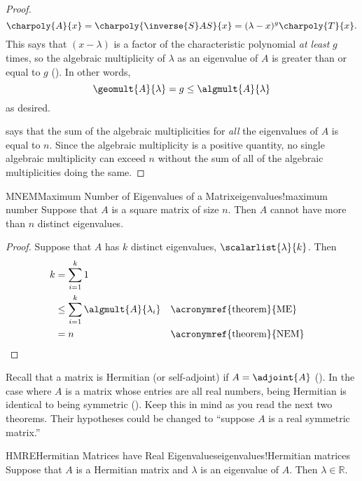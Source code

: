 \begin{proof}
%
\begin{equation*}
\charpoly{A}{x}=\charpoly{\inverse{S}AS}{x}=(\lambda-x)^g\charpoly{T}{x}.
\end{equation*}
%
This says that $(x-\lambda)$ is a factor of the characteristic polynomial {\em at least} $g$ times, so the algebraic multiplicity of $\lambda$ as an eigenvalue of $A$ is greater than or equal to $g$ ().  In other words,
%
\begin{equation*}
\geomult{A}{\lambda}=g\leq\algmult{A}{\lambda}
\end{equation*}
%
as desired.\par
%
 says that the sum of the algebraic multiplicities for {\em all} the eigenvalues of $A$ is equal to $n$.  Since the algebraic multiplicity is a positive quantity, no single algebraic multiplicity can exceed $n$ without the sum of all of the algebraic multiplicities doing the same.
%
\end{proof}
%
%
\begin{theorem}{MNEM}{Maximum Number of Eigenvalues of a Matrix}{eigenvalues!maximum number}
Suppose that $A$ is a square matrix of size $n$.  Then $A$ cannot have more than $n$ distinct eigenvalues.
\end{theorem}
%
\begin{proof}
Suppose that $A$ has $k$ distinct eigenvalues, $\scalarlist{\lambda}{k}$.  Then
%
\begin{align*}
k&=\sum_{i=1}^{k}1\\
&\leq\sum_{i=1}^{k}\algmult{A}{\lambda_i}&&\text{\acronymref{theorem}{ME}}\\
&=n&&\text{\acronymref{theorem}{NEM}}
\end{align*}
%
\end{proof}
%
%
Recall that a matrix is Hermitian (or self-adjoint) if $A=\adjoint{A}$ ().  In the case where $A$ is a matrix whose entries are all real numbers, being Hermitian is identical to being symmetric ().  Keep this in mind as you read the next two theorems.  Their hypotheses could be changed to ``suppose $A$ is a real symmetric matrix.''
%
\begin{theorem}{HMRE}{Hermitian Matrices have Real Eigenvalues}{eigenvalues!Hermitian matrices}
Suppose that $A$ is a Hermitian matrix and $\lambda$ is an eigenvalue of $A$.  Then $\lambda\in{\mathbb R}$.
\end{theorem}
%
